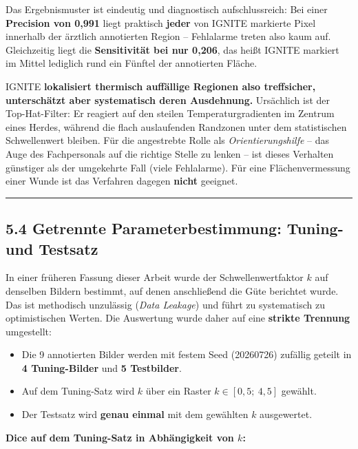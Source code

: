 \documentclass[
  11pt,
]{article}
\providecommand{\tightlist}{%
  \setlength{\itemsep}{0pt}\setlength{\parskip}{0pt}}
\begin{document}
Das Ergebnismuster ist eindeutig und diagnostisch aufschlussreich: Bei
einer \textbf{Precision von 0,991} liegt praktisch \textbf{jeder} von
IGNITE markierte Pixel innerhalb der ärztlich annotierten Region --
Fehlalarme treten also kaum auf. Gleichzeitig liegt die
\textbf{Sensitivität bei nur 0,206}, das heißt IGNITE markiert im Mittel
lediglich rund ein Fünftel der annotierten Fläche.

IGNITE \textbf{lokalisiert thermisch auffällige Regionen also
treffsicher, unterschätzt aber systematisch deren Ausdehnung.}
Ursächlich ist der Top-Hat-Filter: Er reagiert auf den steilen
Temperaturgradienten im Zentrum eines Herdes, während die flach
auslaufenden Randzonen unter dem statistischen Schwellenwert bleiben.
Für die angestrebte Rolle als \emph{Orientierungshilfe} -- das Auge des
Fachpersonals auf die richtige Stelle zu lenken -- ist dieses Verhalten
günstiger als der umgekehrte Fall (viele Fehlalarme). Für eine
Flächenvermessung einer Wunde ist das Verfahren dagegen \textbf{nicht}
geeignet.

\begin{center}\rule{0.5\linewidth}{0.5pt}\end{center}

\subsection{5.4 Getrennte Parameterbestimmung: Tuning- und
Testsatz}\label{getrennte-parameterbestimmung-tuning--und-testsatz}

In einer früheren Fassung dieser Arbeit wurde der Schwellenwertfaktor
\(k\) auf denselben Bildern bestimmt, auf denen anschließend die Güte
berichtet wurde. Das ist methodisch unzulässig (\emph{Data Leakage}) und
führt zu systematisch zu optimistischen Werten. Die Auswertung wurde
daher auf eine \textbf{strikte Trennung} umgestellt:

\begin{itemize}
\tightlist
\item
  Die 9 annotierten Bilder werden mit festem Seed (20260726) zufällig
  geteilt in \textbf{4 Tuning-Bilder} und \textbf{5 Testbilder}.
\item
  Auf dem Tuning-Satz wird \(k\) über ein Raster
  \(k \in [0{,}5;\ 4{,}5]\) gewählt.
\item
  Der Testsatz wird \textbf{genau einmal} mit dem gewählten \(k\)
  ausgewertet.
\end{itemize}

\textbf{Dice auf dem Tuning-Satz in Abhängigkeit von \(k\):}
\end{document}

